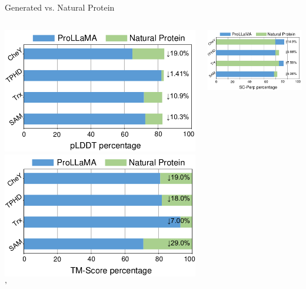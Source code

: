 \documentclass[dvipsnames,
hyperref={citecolor=blue}
]{beamer}
\begin{document}
\begin{frame}{Generated vs. Natural Protein}
	\begin{columns}
		\begin{column}{0.5\textwidth}
			\includegraphics[scale=0.7]{images/d.png}
			\includegraphics[scale=0.7]{images/f.png}'
		\end{column}
		\begin{column}{0.5\textwidth}
			\includegraphics[scale=0.7]{images/e.png}

\end{column}
\end{columns}
\end{frame}
\end{document}
